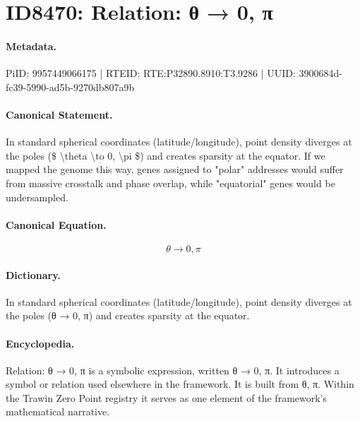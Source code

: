 \section*{ID8470: Relation: θ → 0, π}
\paragraph{Metadata.}
PiID: 9957449066175 | RTEID: RTE:P32890.8910:T3.9286 | UUID: 3900684d-fc39-5990-ad5b-9270db807a9b

\paragraph{Canonical Statement.}
In standard spherical coordinates (latitude/longitude), point density diverges at the poles (\$ \textbackslash{}theta \textbackslash{}to 0, \textbackslash{}pi \$) and creates sparsity at the equator. If we mapped the genome this way, genes assigned to "polar" addresses would suffer from massive crosstalk and phase overlap, while "equatorial" genes would be undersampled.

\paragraph{Canonical Equation.}
\[
\theta \to 0, \pi
\]

\paragraph{Dictionary.}
In standard spherical coordinates (latitude/longitude), point density diverges at the poles (θ → 0, π) and creates sparsity at the equator.

\paragraph{Encyclopedia.}
Relation: θ → 0, π is a symbolic expression, written θ → 0, π. It introduces a symbol or relation used elsewhere in the framework. It is built from θ, π. Within the Trawin Zero Point registry it serves as one element of the framework's mathematical narrative.
